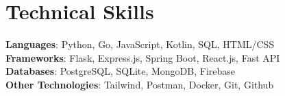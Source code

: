 \section{Technical Skills}
    \vspace{3pt}
    \begin{itemize}[leftmargin=0.15in, label={}]
	\small{\item{
		\textbf{Languages}{: 
  Python,
  Go,
  JavaScript,
  Kotlin,
  SQL,
  HTML/CSS
  }  \\ \vspace{2.5pt}
		\textbf{Frameworks}{: 
  Flask,
  Express.js,
  Spring Boot,
  React.js,
  Fast API
  }  \\ \vspace{2.5pt}
		\textbf{Databases}{: 
  PostgreSQL,
  SQLite,
  MongoDB,
  Firebase
  }  \\ \vspace{2.5pt}
  		\textbf{Other Technologies}{: 
    Tailwind,
    Postman,
    Docker,
    Git,
    Github
	}
 }}
    \end{itemize}
